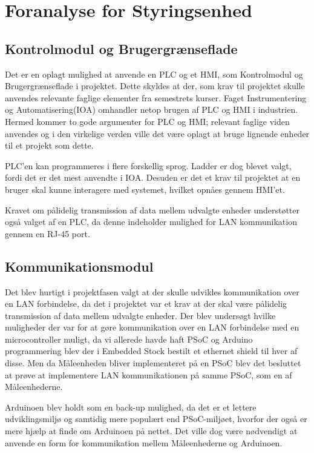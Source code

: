 
\section{Foranalyse for Styringsenhed}

\subsection{Kontrolmodul og Brugergrænseflade}
Det er en oplagt mulighed at anvende en PLC og et HMI, som Kontrolmodul og Brugergrænseflade i projektet. Dette skyldes at der, som krav til projektet skulle anvendes relevante faglige elementer fra semestrets kurser. Faget Instrumentering og Automatisering(IOA) omhandler netop brugen af PLC og HMI i industrien. Hermed kommer to gode argumenter for PLC og HMI; relevant faglige viden anvendes og i den virkelige verden ville det være oplagt at bruge lignende enheder til et projekt som dette.


PLC'en kan programmeres i flere forskellig sprog. Ladder er dog blevet valgt, fordi det er det mest anvendte i IOA. Desuden er det et krav til projektet at en bruger skal kunne interagere med systemet, hvilket opnåes gennem HMI'et.


Kravet om pålidelig transmission af data mellem udvalgte enheder understøtter også valget af en PLC, da denne indeholder mulighed for LAN kommunikation gennem en RJ-45 port.

\subsection{Kommunikationsmodul}
Det blev hurtigt i projektfasen valgt at der skulle udvikles kommunikation over en LAN forbindelse, da det i projektet var et krav at der skal være pålidelig transmission af data mellem udvalgte enheder. Der blev undersøgt hvilke muligheder der var for at gøre kommunikation over en LAN forbindelse med en microcontroller muligt, da vi allerede havde haft PSoC og Arduino programmering blev der i Embedded Stock bestilt et ethernet shield til hver af disse. Men da Måleenheden bliver implementeret på en PSoC blev det besluttet at prøve at implementere LAN kommunikationen på samme PSoC, som en af Måleenhederne. 


Arduinoen blev holdt som en back-up mulighed, da det er et lettere udviklingsmiljø og samtidig mere populært end PSoC-miljøet, hvorfor der også er mere hjælp at finde om Arduinoen på nettet. Det ville dog være nødvendigt at anvende en form for kommunikation mellem Måleenhederne og Arduinoen. 






